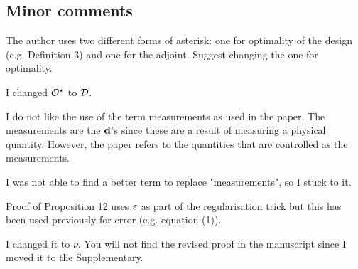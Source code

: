 \subsection{Minor comments}
\RC The author uses two different forms of asterisk: one for
optimality of the design (e.g. Definition 3) and one for the
adjoint. Suggest changing the one for optimality.

\AR I changed $\mathcal{O}^\star$ to $\mathcal{D}$.


  
\RC I do not like the use of the term measurements as used in the
paper. The measurements are the $\mathbf{d}$’s since these are a result of
measuring a physical quantity. However, the paper refers to the
quantities that are controlled as the measurements.

\AR I was not able to find a better term to replace "measurements", so
I stuck to it.

  
\RC Proof of Proposition 12 uses $\varepsilon$ as part of the regularisation
trick but this has been used previously for error (e.g. equation (1)).
  
\AR I changed it to $\nu$. You will not find the revised proof in the
manuscript since I moved it to the Supplementary.

